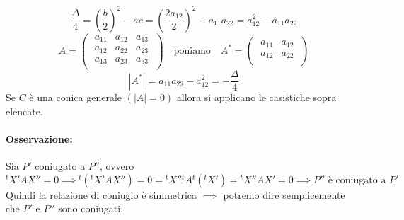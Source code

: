 \documentclass{report}
\begin{document}
\[
\frac{\Delta}{4} = \left( \frac{b}{2} \right) ^2 - ac = \left( \frac{2a_{12}}{2} \right) ^2 - a_{11} a_{22} = a_{12}^2 - a_{11} a_{22}
\] \[
A = 
\left( \; \begin{matrix}
    a_{11} & a_{12} & a_{13} \\
    a_{12} & a_{22} & a_{23} \\
    a_{13} & a_{23} & a_{33} \\
\end{matrix} \; \right)
\quad \text{poniamo} \quad A^* =
\left( \; \begin{matrix}
    a_{11} & a_{12} \\
    a_{12} & a_{22} \\
\end{matrix} \; \right) \]
\[
|A^{*}| = a_{11}a_{22}-a_{12}^2= - \frac{\Delta}{4}
\] Se \(C\) è una conica generale \((|A| = 0)\) allora si applicano le casistiche sopra elencate.


\paragraph{Osservazione:} Sia \(P'\) coniugato a \(P ''\), ovvero \[
    {^tX'} A X '' = 0 \implies {^t({^tX'}AX '')} = 0 = {^tX ''} {^tA}{^t({^tX'})} = {^tX ''} A X' = 0 \implies P '' \text{ è coniugato a } P' 
\] Quindi la relazione di coniugio è simmetrica \(\implies \) potremo dire semplicemente che \(P'\) e \(P ''\) sono coniugati.

\end{document}
